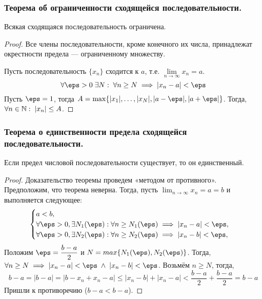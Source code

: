 \documentclass[12pt, a4paper]{article}
\begin{document}
	\subsubsection{Теорема об ограниченности сходящейся последовательности.}
	Всякая сходящаяся последовательность ограничена.
	\begin{proof}
		Все члены последовательности, кроме конечного их числа, принадлежат окрестности предела --- ограниченному множеству.

		Пусть последовательность $\{x_n\}$ сходится к $a$, т.е. $\lim\limits_{n \to \infty} x_n = a$. 
		\begin{equation*}
			\forall \eps > 0 \; \exists N: \; \forall n \geq N \implies |x_n - a| < \eps
		\end{equation*}
		Пусть $\eps = 1$, тогда $A = \max\{|x_1|, \dots, |x_N|, |a - \eps|, |a + \eps|\}$. Тогда, $\forall n \in \mathbb{N}: \; |x_n| \leq A$.
	\end{proof}
		
	\subsubsection{Теорема о единственности предела сходящейся последовательности.}
	\begin{theorem*}
		Если предел числовой последовательности существует, то он единственный.
	\end{theorem*}
	\begin{proof}
		 Доказательство теоремы проведем «методом от противного». Предположим, что теорема неверна. Тогда, пусть $\lim_{n \to \infty} x_n = a = b$ и выполняется следующее:
		 \begin{equation*}
		 	\begin{cases}
		 		a < b, \\
		 		\forall \eps > 0, \exists N_1(\eps): \forall n \geq N_1(\eps) \implies |x_n - a| < \eps, \\
		 		\forall \eps > 0, \exists N_2(\eps): \forall n \geq N_2(\eps) \implies |x_n - b| < \eps, \\
		 	\end{cases}
		 \end{equation*}
		 Положим $\eps = \dfrac{b - a}{2}$ и $N = max\{N_1(\eps), N_2(\eps)\}$. Тогда, $\forall n \geq N \implies  |x_n - a| < \eps \; \land \; |x_n - b| < \eps$. Возьмём $n \geq N$, тогда,
		 \begin{equation*}
		 	b - a = |b - a| = |b - x_n + x_n - a| \leq |x_n - b| + |x_n - a| < \dfrac{b - a}{2} + \dfrac{b - a}{2} = b - a
		 \end{equation*}
		 Пришли к противоречию ($b - a < b - a$).
	\end{proof}
\end{document}
